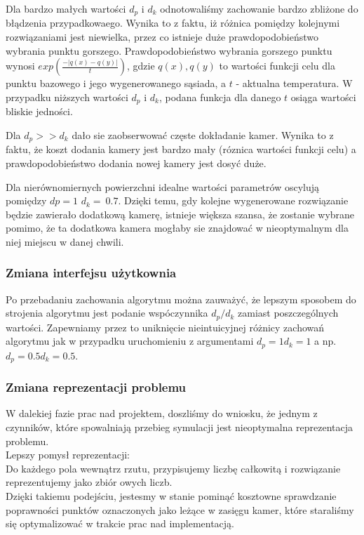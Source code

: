 \documentclass[12pt,a4paper]{article}
\begin{document}
Dla bardzo małych wartości $d_p$ i $d_k$ odnotowaliśmy zachowanie bardzo zbliżone do błądzenia przypadkowaego.
Wynika to z faktu, iż różnica pomiędzy kolejnymi rozwiązaniami jest niewielka, przez co istnieje duże prawdopodobieństwo wybrania punktu gorszego. Prawdopodobieństwo wybrania gorszego punktu wynosi
$exp(\frac{-|q(x)-q(y)|}{t})$, gdzie $q(x), q(y)$ to wartości funkcji celu dla punktu bazowego i jego wygenerowanego sąsiada, a $t$ - aktualna temperatura. W przypadku niższych wartości $d_p$ i $d_k$, podana funkcja dla danego $t$ osiąga
wartości bliskie jedności. 


\begin{figure}[h]
\begin{floatrow}
       }
       \ffigbox[\FBwidth]{\caption{SlimMap, $d_p=1$, $d_k=0.1$, $skala=5$}\label{fig-8}}{%
         \texttt{[image: \{slimMap\_1\_0.1\_5]}.png}
       }
       \end{floatrow}
\end{figure}

Dla $d_p >> d_k$ dało sie zaobserwować częste dokładanie kamer. Wynika to z faktu, że koszt dodania kamery jest bardzo mały (róznica wartości funkcji celu) a prawdopodobieństwo dodania nowej kamery jest dosyć duże.

Dla nierównomiernych powierzchni idealne wartości parametrów oscylują pomiędzy $dp=1$ $d_k=~0.7$.
Dzięki temu, gdy kolejne wygenerowane rozwiązanie będzie zawierało dodatkową kamerę, istnieje większa szansa,
że zostanie wybrane pomimo, że ta dodatkowa kamera mogłaby sie znajdować w nieoptymalnym dla niej miejscu w danej chwili.

\newpage
\subsubsection{Zmiana interfejsu użytkownia}
Po przebadaniu zachowania algorytmu można zauważyć, że lepszym sposobem do strojenia algorytmu jest podanie
wspóczynnika $d_p/d_k$ zamiast poszczególnych wartości. Zapewniamy przez to uniknięcie nieintuicyjnej
różnicy zachowań algorytmu jak w przypadku uruchomieniu z argumentami $d_p=1 d_k=1$ a np. $d_p=0.5 d_k=0.5$.

\subsubsection{Zmiana reprezentacji problemu}
W dalekiej fazie prac nad projektem, doszliśmy do wniosku, że jednym z czynników, które spowalniają przebieg symulacji jest nieoptymalna reprezentacja problemu.\\
Lepszy pomysł reprezentacji: \\
Do każdego pola wewnątrz rzutu, przypisujemy liczbę całkowitą i rozwiązanie reprezentujemy jako zbiór owych liczb. \\
Dzięki takiemu podejściu, jestesmy w stanie pominąć kosztowne sprawdzanie poprawności punktów oznaczonych jako leżące w zasięgu kamer, które staraliśmy się optymalizować w trakcie prac nad implementacją.
\end{document}
